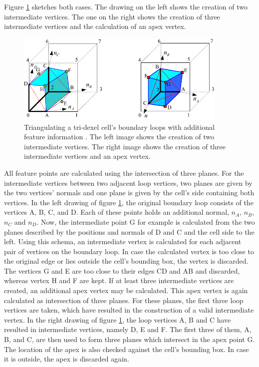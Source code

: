Figure \ref{fig:tri_dexel_refinement} sketches both cases.
The drawing on the left shows the creation of two intermediate vertices.
The one on the right shows the creation of three intermediate vertices and the calculation of an apex vertex.
%
\begin{figure}
	\centering
	\includegraphics[width=0.9\textwidth]{images/tri_dexel_refinement}
	\caption{
		Triangulating a tri-dexel cell's boundary loops with additional feature information \cite{tridexel_reconstruction}.
		The left image shows the creation of two intermediate vertices.
		The right image shows the creation of three intermediate vertices and an apex vertex.
	}
	\label{fig:tri_dexel_refinement}
\end{figure}
%
All feature points are calculated using the intersection of three planes.
For the intermediate vertices between two adjacent loop vertices, two planes are given by the two vertices' normals and one plane is given by the cell's side containing both vertices.
In the left drawing of figure \ref{fig:tri_dexel_refinement}, the original boundary loop consists of the vertices A, B, C, and D.
Each of these points holds an additional normal, $n_A$, $n_B$, $n_C$ and $n_D$.
Now, the intermediate point G for example is calculated from the two planes described by the positions and normals of D and C and the cell side to the left.
Using this schema, an intermediate vertex is calculated for each adjacent pair of vertices on the boundary loop.
In case the calculated vertex is too close to the original edge or lies outside the cell's bounding box, the vertex is discarded.
The vertices G and E are too close to their edges CD and AB and discarded, whereas vertex H and F are kept.
%
If at least three intermediate vertices are created, an additional apex vertex may be calculated.
This apex vertex is again calculated as intersection of three planes.
For these planes, the first three loop vertices are taken, which have resulted in the construction of a valid intermediate vertex.
In the right drawing of figure \ref{fig:tri_dexel_refinement}, the loop vertices A, B and C have resulted in intermediate vertices, namely D, E and F.
The first three of them, A, B, and C, are then used to form three planes which intersect in the apex point G.
The location of the apex is also checked against the cell's bounding box.
In case it is outside, the apex is discarded again.

